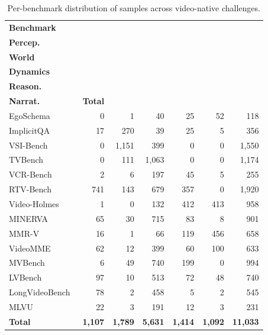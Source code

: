         \begin{table}[h]
        \centering
        \footnotesize
        \setlength{\tabcolsep}{3pt}
        \renewcommand{\arraystretch}{1.0}
        
        \caption{Per-benchmark distribution of samples across video-native challenges.}
        \label{tab:supp_benchmark_category}
        \begin{tabular}{lrrrrrr}
        \toprule
        \textbf{Benchmark} &
        \makecell{\textbf{Fine}\\\textbf{Percep.}} &
        \makecell{\textbf{Spatial}\\\textbf{World}} &
        \makecell{\textbf{Temporal}\\\textbf{Dynamics}} &
        \makecell{\textbf{Causal}\\\textbf{Reason.}} &
        \makecell{\textbf{Global}\\\textbf{Narrat.}} &
        \textbf{Total} \\
        \midrule
        EgoSchema~\cite{egoschema}          & 0 & 1 & 40 & 25 & 52 & 118 \\
        ImplicitQA~\cite{implicitqa}        & 17 & 270 & 39 & 25 & 5 & 356 \\
        VSI-Bench~\cite{vsibench}           & 0 & 1,151 & 399 & 0 & 0 & 1,550 \\
        \midrule
        TVBench~\cite{tvbench}              & 0 & 111 & 1,063 & 0 & 0 & 1,174 \\
        VCR-Bench~\cite{vcrbench}           & 2 & 6 & 197 & 45 & 5 & 255 \\
        RTV-Bench~\cite{rtvbench}           & 741 & 143 & 679 & 357 & 0 & 1,920 \\
        \midrule
        Video-Holmes~\cite{videoholmes}     & 1 & 0 & 132 & 412 & 413 & 958 \\
        MINERVA~\cite{minerva}              & 65 & 30 & 715 & 83 & 8 & 901 \\
        MMR-V~\cite{mmrv}                   & 16 & 1 & 66 & 119 & 456 & 658 \\
        \midrule
        VideoMME~\cite{videomme}           & 62 & 12 & 399 & 60 & 100 & 633 \\
        MVBench~\cite{mvbench}              & 6 & 49 & 740 & 199 & 0 & 994 \\
        LVBench~\cite{lvbench}              & 97 & 10 & 513 & 72 & 48 & 740 \\
        LongVideoBench~\cite{longvideobench}& 78 & 2 & 458 & 5 & 2 & 545 \\
        MLVU~\cite{mlvu}                    & 22 & 3 & 191 & 12 & 3 & 231 \\
        \midrule
        \rowcolor{gray!10}
        \textbf{Total} & \textbf{1,107} & \textbf{1,789} & \textbf{5,631} & \textbf{1,414} & \textbf{1,092} & \textbf{11,033} \\
        \bottomrule
        \end{tabular}
        \end{table}
                
